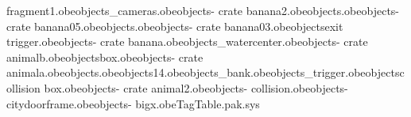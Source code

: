 fragment1.obe objects\transport_cameras.obe objects\bank - crate banana2.obe objects\spinpad.obe objects\bank - crate banana05.obe objects\gull.obe objects\bank - crate banana03.obe objects\camera exit trigger.obe objects\bank - crate banana.obe objects\bank_watercenter.obe objects\bank - crate animalb.obe objects\wackin box.obe objects\bank - crate animala.obe objects\planetx.obe objects\box14.obe objects\zoohubdoor_bank.obe objects\stats_trigger.obe objects\elephant collision box.obe objects\bank - crate animal2.obe objects\bank - collision.obe objects\bank - citydoorframe.obe objects\bank - bigx.obe TagTable.pak.sys 